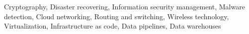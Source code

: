 Cryptography, Disaster recovering, Information security management, Malware detection, Cloud networking, Routing and switching, Wireless technology, Virtualization, Infrastructure as code, Data pipelines, Data warehouses